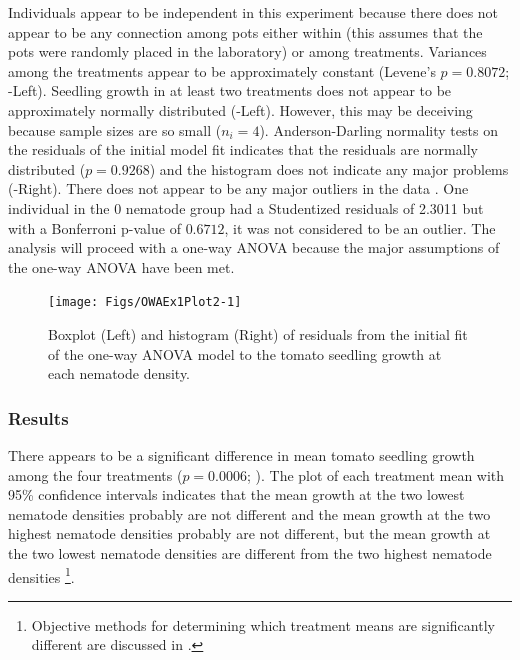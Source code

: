 \documentclass[10pt,openany]{book}\usepackage[]{graphicx}\usepackage[]{color}
\newenvironment{knitrout}{}{} %
\begin{document}
Individuals appear to be independent in this experiment because there does not appear to be any connection among pots either within (this assumes that the pots were randomly placed in the laboratory) or among treatments.  Variances among the treatments appear to be approximately constant (Levene's $p=0.8072$; -Left).  Seedling growth in at least two treatments does not appear to be approximately normally distributed (-Left).  However, this may be deceiving because sample sizes are so small ($n_{i}=4$).  Anderson-Darling normality tests on the residuals of the initial model fit indicates that the residuals are normally distributed ($p=0.9268$) and the histogram does not indicate any major problems (-Right).  There does not appear to be any major outliers in the data .  One individual in the 0 nematode group had a Studentized residuals of 2.3011 but with a Bonferroni p-value of $0.6712$, it was not considered to be an outlier.  The analysis will proceed with a one-way ANOVA because the major assumptions of the one-way ANOVA have been met.

\begin{knitrout}
\color{fgcolor}\begin{figure}[hbtp]

{\centering \texttt{[image: Figs/OWAEx1Plot2-1]} 

}

\caption[Boxplot (Left) and histogram (Right) of residuals from the initial fit of the one-way ANOVA model to the tomato seedling growth at each nematode density]{Boxplot (Left) and histogram (Right) of residuals from the initial fit of the one-way ANOVA model to the tomato seedling growth at each nematode density.}\label{fig:OWAEx1Plot2}
\end{figure}


\end{knitrout}

\subsubsection*{Results}
There appears to be a significant difference in mean tomato seedling growth among the four treatments ($p=0.0006$; ).  The plot of each treatment mean with 95\% confidence intervals indicates that the mean growth at the two lowest nematode densities probably are not different and the mean growth at the two highest nematode densities probably are not different, but the mean growth at the two lowest nematode densities are different from the two highest nematode densities \footnote{Objective methods for determining which treatment means are significantly different are discussed in .}.
\end{document}
